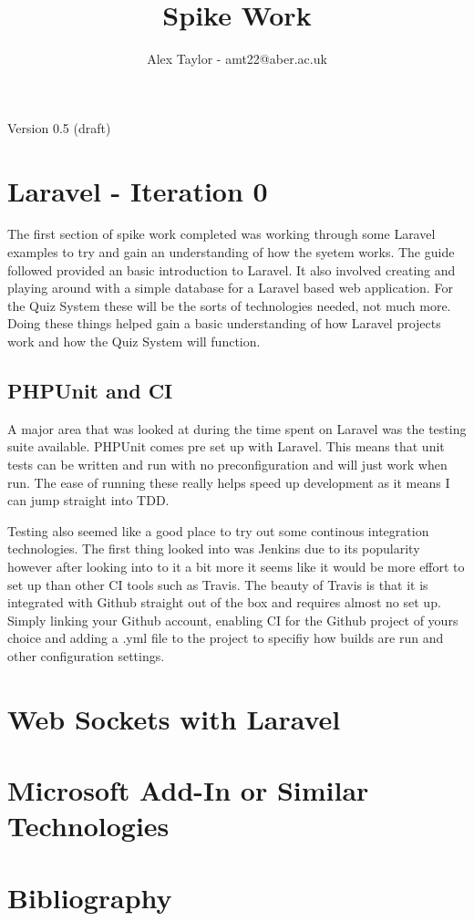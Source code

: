 \documentclass{article}
\title{Spike Work}
\author{Alex Taylor - amt22@aber.ac.uk}
\begin{document}
\maketitle
\begin{center}
	Version 0.5 (draft)
\end{center}
\tableofcontents
\thispagestyle{empty}
\newpage

\section{Laravel - Iteration 0}
The first section of spike work completed was working through some Laravel examples to try and gain an understanding of how the syetem works. The guide\cite{Laravel5Guide} followed provided an basic introduction to Laravel. It also involved creating and playing around with a simple database for a Laravel based web application. For the Quiz System these will be the sorts of technologies needed, not much more. Doing these things helped gain a basic understanding of how Laravel projects work and how the Quiz System will function.
\subsection{PHPUnit and CI}
A major area that was looked at during the time spent on Laravel was the testing suite available. PHPUnit comes pre set up with Laravel. This means that unit tests can be written and run with no preconfiguration and will just work when run. The ease of running these really helps speed up development as it means I can jump straight into TDD.

Testing also seemed like a good place to try out some continous integration technologies. The first thing looked into was Jenkins due to its popularity however after looking into to it a bit more it seems like it would be more effort to set up than other CI tools such as Travis. The beauty of Travis is that it is integrated with Github straight out of the box and requires almost no set up. Simply linking your Github account, enabling CI for the Github project of yours choice and adding a .yml file to the project to specifiy how builds are run and other configuration settings.
\newpage

\section{Web Sockets with Laravel}
\newpage

\section{Microsoft Add-In or Similar Technologies}
\newpage

\section{Bibliography}


\end{document}
